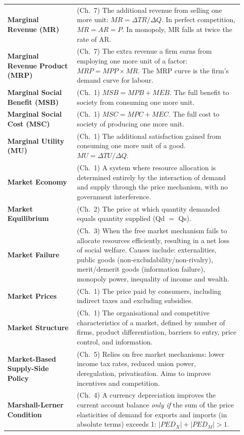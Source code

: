 \documentclass[11pt, a4paper, twoside]{book}
\begin{document}
\begin{longtable}{@{}>{\RaggedRight\arraybackslash}p{0.28\linewidth}>{\RaggedRight\arraybackslash}p{0.67\linewidth}@{}}
\textbf{Marginal Revenue (MR)} & (Ch.~7) The additional revenue from selling one more unit: $MR = \Delta TR / \Delta Q$. In perfect competition, $MR = AR = P$. In monopoly, MR falls at twice the rate of AR. \\
\textbf{Marginal Revenue Product (MRP)} & (Ch.~7) The extra revenue a firm earns from employing one more unit of a factor: $MRP = MPP \times MR$. The MRP curve is the firm's demand curve for labour. \\
\textbf{Marginal Social Benefit (MSB)} & (Ch.~1) $MSB = MPB + MEB$. The full benefit to society from consuming one more unit. \\
\textbf{Marginal Social Cost (MSC)} & (Ch.~1) $MSC = MPC + MEC$. The full cost to society of producing one more unit. \\
\textbf{Marginal Utility (MU)} & (Ch.~1) The additional satisfaction gained from consuming one more unit of a good. $MU = \Delta TU / \Delta Q$. \\
\textbf{Market Economy} & (Ch.~1) A system where resource allocation is determined entirely by the interaction of demand and supply through the price mechanism, with no government interference. \\
\textbf{Market Equilibrium} & (Ch.~2) The price at which quantity demanded equals quantity supplied (Qd $=$ Qs). \\
\textbf{Market Failure} & (Ch.~3) When the free market mechanism fails to allocate resources efficiently, resulting in a net loss of social welfare. Causes include: externalities, public goods (non-excludability/non-rivalry), merit/demerit goods (information failure), monopoly power, inequality of income and wealth. \\
\textbf{Market Prices} & (Ch.~1) The price paid by consumers, including indirect taxes and excluding subsidies. \\
\textbf{Market Structure} & (Ch.~1) The organisational and competitive characteristics of a market, defined by number of firms, product differentiation, barriers to entry, price control, and information. \\
\textbf{Market-Based Supply-Side Policy} & (Ch.~5) Relies on free market mechanisms: lower income tax rates, reduced union power, deregulation, privatisation. Aims to improve incentives and competition. \\
\textbf{Marshall-Lerner Condition} & (Ch.~4) A currency depreciation improves the current account balance \textit{only if} the sum of the price elasticities of demand for exports and imports (in absolute terms) exceeds 1: $|PED_X| + |PED_M| > 1$. \\

\end{longtable}
\end{document}
